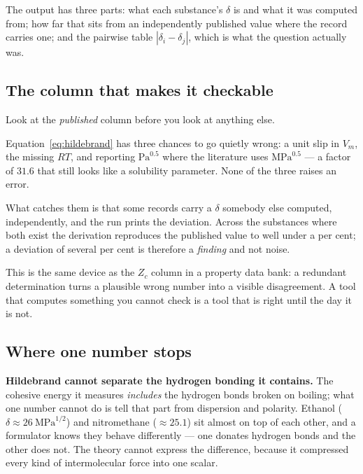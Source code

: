 \documentclass[11pt,a4paper]{article}
\begin{document}
The output has three parts: what each substance's $\delta$ is and what it
was computed from; how far that sits from an independently published
value where the record carries one; and the pairwise table
$|\delta_i - \delta_j|$, which is what the question actually was.

\subsection{The column that makes it checkable}

\begin{tryit}
Look at the \emph{published} column before you look at anything else.

Equation~\ref{eq:hildebrand} has three chances to go quietly wrong: a unit
slip in $V_m$, the missing $RT$, and reporting $\mathrm{Pa}^{0.5}$ where
the literature uses $\mathrm{MPa}^{0.5}$ --- a factor of $31.6$ that still
looks like a solubility parameter.  None of the three raises an error.

What catches them is that some records carry a $\delta$ somebody else
computed, independently, and the run prints the deviation.  Across the
substances where both exist the derivation reproduces the published value
to well under a per cent; a deviation of several per cent is therefore a
\emph{finding} and not noise.

This is the same device as the $Z_c$ column in a property data bank: a
redundant determination turns a plausible wrong number into a visible
disagreement.  A tool that computes something you cannot check is a tool
that is right until the day it is not.
\end{tryit}

\subsection{Where one number stops}

\textbf{Hildebrand cannot separate the hydrogen bonding it contains.}
The cohesive energy it measures \emph{includes} the hydrogen bonds broken
on boiling; what one number cannot do is tell that part from dispersion
and polarity.  Ethanol ($\delta \approx 26~\mathrm{MPa}^{1/2}$) and
nitromethane ($\approx 25.1$) sit almost on top of each other, and a
formulator knows they behave differently --- one donates hydrogen bonds
and the other does not.  The theory cannot express the difference,
because it compressed every kind of intermolecular force into one scalar.
\end{document}
